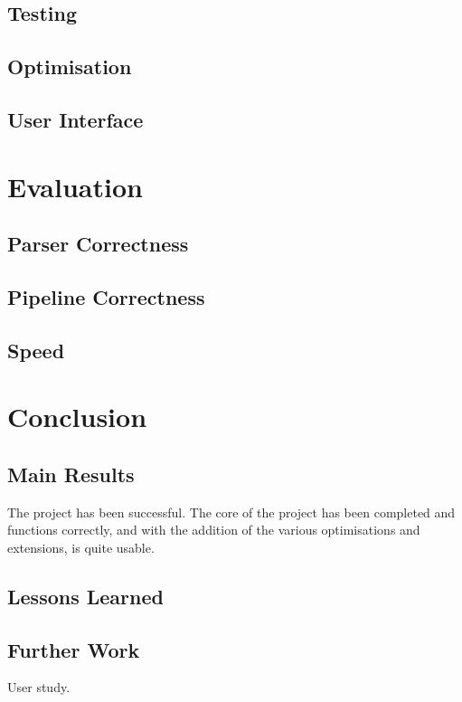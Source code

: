 \documentclass[12pt,twoside,notitlepage]{report}
\begin{document}
\section{Testing}

\section{Optimisation}

\section{User Interface}

\cleardoublepage
\chapter{Evaluation}

\section{Parser Correctness}

\section{Pipeline Correctness}

\section{Speed}


\cleardoublepage
\chapter{Conclusion}

\section{Main Results}
The project has been successful. The core of the project has been completed and functions correctly, and with the addition of the various optimisations and extensions, is quite usable.

\section{Lessons Learned}

\section{Further Work}
User study.
\end{document}
